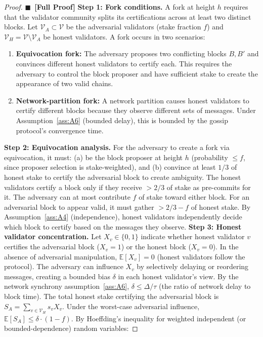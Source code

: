 \documentclass[11pt,a4paper]{article}
\theoremstyle{definition}
\newcommand{\rigorFull}[0]{$\blacksquare$~\textbf{[Full Proof]}}
\newcommand{\E}{\mathbb{E}}
\newcommand{\validatorSet}{\mathcal{V}}
\begin{document}
\begin{proof}\rigorFull
\textbf{Step 1: Fork conditions.} A fork at height $h$ requires that the validator community splits its certifications across at least two distinct blocks. Let $\mathcal{V}_A \subset \validatorSet$ be the adversarial validators (stake fraction $f$) and $\mathcal{V}_H = \validatorSet \setminus \mathcal{V}_A$ be honest validators. A fork occurs in two scenarios:
\begin{enumerate}
    \item \textbf{Equivocation fork:} The adversary proposes two conflicting blocks $B, B'$ and convinces different honest validators to certify each. This requires the adversary to control the block proposer and have sufficient stake to create the appearance of two valid chains.
    \item \textbf{Network-partition fork:} A network partition causes honest validators to certify different blocks because they observe different sets of messages. Under Assumption~\ref{ass:A6} (bounded delay), this is bounded by the gossip protocol's convergence time.
\end{enumerate}
\textbf{Step 2: Equivocation analysis.} For the adversary to create a fork via equivocation, it must: (a) be the block proposer at height $h$ (probability $\leq f$, since proposer selection is stake-weighted), and (b) convince at least $1/3$ of honest stake to certify the adversarial block to create ambiguity. The honest validators certify a block only if they receive $>2/3$ of stake as pre-commits for it. The adversary can at most contribute $f$ of stake toward either block. For an adversarial block to appear valid, it must gather $>2/3 - f$ of honest stake. By Assumption~\ref{ass:A4} (independence), honest validators independently decide which block to certify based on the messages they observe.
\textbf{Step 3: Honest validator concentration.} Let $X_v \in \{0, 1\}$ indicate whether honest validator $v$ certifies the adversarial block ($X_v = 1$) or the honest block ($X_v = 0$). In the absence of adversarial manipulation, $\E[X_v] = 0$ (honest validators follow the protocol). The adversary can influence $X_v$ by selectively delaying or reordering messages, creating a bounded bias $\delta$ in each honest validator's view. By the network synchrony assumption~\ref{ass:A6}, $\delta \leq \Delta / \tau$ (the ratio of network delay to block time).
The total honest stake certifying the adversarial block is $S_A = \sum_{v \in \mathcal{V}_H} s_v X_v$. Under the worst-case adversarial influence, $\E[S_A] \leq \delta \cdot (1-f)$. By Hoeffding's inequality for weighted independent (or bounded-dependence) random variables:

\end{proof}
\end{document}
